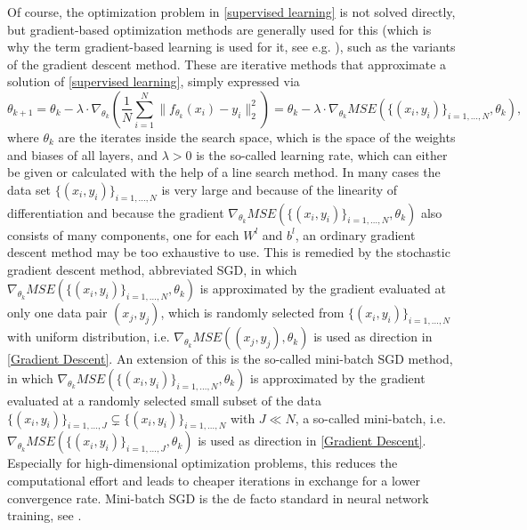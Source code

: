 Of course, the optimization problem in \cref{supervised learning} is not solved directly, but gradient-based optimization methods are generally used for this (which is why the term gradient-based learning is used for it, see e.g. \cite[p.~177]{GoodfellowBengioCourville:2016}), such as the variants of the gradient descent method. These are iterative methods that approximate a solution of \cref{supervised learning}, simply expressed via 
\begin{equation}
    \label{Gradient Descent}
    \theta_{k+1} = \theta_k - \lambda \cdot \nabla_{\theta_k} \left( \frac{1}{N}\sum_{i=1}^{N} \lVert f_{\theta_k} \left(x_{i}\right) - y_{i}\rVert^{2}_2 \right) = \theta_k - \lambda \cdot \nabla_{\theta_k} MSE(\{ (x_i, y_i) \}_{i = 1, \ldots, N}, \theta_k),
\end{equation}
where $\theta_k$ are the iterates inside the search space, which is the space of the weights and biases of all layers, and $\lambda > 0$ is the so-called learning rate, which can either be given or calculated with the help of a line search method. In many cases the data set $\{ (x_i, y_i) \}_{i = 1, \ldots, N}$ is very large and because of the linearity of differentiation and because the gradient $\nabla_{\theta_k} MSE(\{ (x_i, y_i) \}_{i = 1, \ldots, N}, \theta_k)$ also consists of many components, one for each $W^l$ and $b^l$, an ordinary gradient descent method may be too exhaustive to use. This is remedied by the stochastic gradient descent method, abbreviated SGD, in which $\nabla_{\theta_k} MSE(\{ (x_i, y_i) \}_{i = 1, \ldots, N}, \theta_k)$ is approximated by the gradient evaluated at only one data pair $(x_j, y_j)$, which is randomly selected from $\{ (x_i, y_i) \}_{i = 1, \ldots, N}$ with uniform distribution, i.e. $\nabla_{\theta_k} MSE((x_j, y_j), \theta_k)$ is used as direction in \cref{Gradient Descent}. An extension of this is the so-called mini-batch SGD method, in which $\nabla_{\theta_k} MSE(\{ (x_i, y_i) \}_{i = 1, \ldots, N}, \theta_k)$ is approximated by the gradient evaluated at a randomly selected small subset  of the data $\{ (x_i, y_i) \}_{i = 1, \ldots, J} \subsetneq  \{ (x_i, y_i) \}_{i = 1, \ldots, N}$ with $J \ll N$, a so-called mini-batch, i.e. $\nabla_{\theta_k} MSE(\{ (x_i, y_i) \}_{i = 1, \ldots, J}, \theta_k)$ is used as direction in \cref{Gradient Descent}. Especially for high-dimensional optimization problems, this reduces the computational effort and leads to cheaper iterations in exchange for a lower convergence rate. Mini-batch SGD is the de facto standard in neural network training, see \cite[sections~5.9~+~8.3.1]{GoodfellowBengioCourville:2016}. \\
